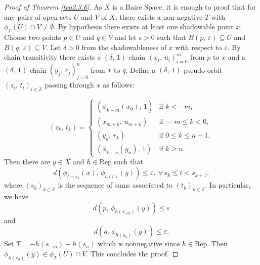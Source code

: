 \documentclass{amsart}
\theoremstyle{definition}
\newcommand{\ep}{\varepsilon}
\begin{document}
\begin{proof}[Proof of Theorem \ref{teo2.3.6}] 
As $X$ is a Baire Space, it is enough to proof that for any pairs of open sets $U$ and $V$ of $X$, there exists a non-negative $T$ with $\phi_T(U)\cap V\neq\emptyset$. By hypothesis there exists at least one shadowable point $x$. Choose  two points $p\in U$ and $q\in V$ and let $\epsilon>0$ such that $B(p,\,\ep)\subseteq U$ and $B(q,\,\ep)\subseteq V$. Let $\delta> 0$ from the shadowableness of $x$ with respect to $\ep$. By chain transitivity there exists a $(\delta,\,1)$-chain $(x_i,\,u_i)_{i=0}^m$ from $p$ to $x$ and a $(\delta,\,1)$-chain $(y_j,\,r_j)_{j=0}^n$ from $x$ to $q$. Define a $(\delta,\,1)$-pseudo-orbit $(z_i,\,t_i)_{i\in\mathbb{Z}}$ passing through $x$ as follows:

\[
(z_k,\,t_k) = \begin{cases} 
(\phi_{k+m}(x_0),\,1) &\mbox{if } k< -m,\\
(x_{m+k},\,u_{m+k}) & \mbox{if } -m\leq k< 0,\\
(y_k,\,r_k) &\mbox{if } 0\leq k\leq n  -1,\\
  (\phi_{k-n}(y_n),\,1)&\mbox{if } k\geq n. 
\end{cases}
\]
Then there are $y\in X$ and $h\in\mathrm{Rep}$ such that 
\[d(\phi_{t-s_k}(x),\,\phi_{h(t)}(y))\leq \ep,\ \forall\,s_k\leq t<s_{k+1},\]
where $(s_k)_{k\in \mathbb{Z}}$ is the sequence of sums associated to $(t_k)_{k\in \mathbb{Z}}$. In particular, we have 
\[
d(p,\,\phi_{h(s_{-m})}(y))\leq\ep
\]
and
\[
d(q,\,\phi_{h(s_{n})}(y))\leq\ep.
\] 
Set $T = -h(s_{-m}) +h(s_n)$ which is nonnegative since $h\in\mathrm{Rep}$. Then $\phi_{h(s_n)}(y)\in \phi_T(U)\cap V$. This concludes the proof.
\end{proof}

\end{document}

